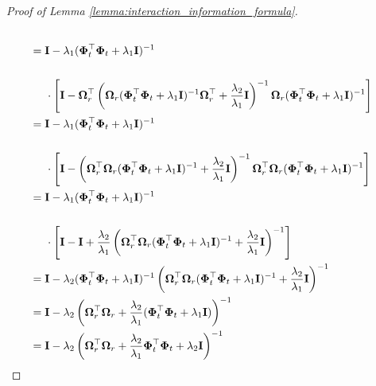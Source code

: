 \begin{proof}[Proof of Lemma \ref{lemma:interaction_information_formula}]
\begin{align}
            \\
            &  = \mathbf{I} -  \lambda_1(\boldsymbol{\Phi}_t^\top\boldsymbol{\Phi}_t+\lambda_1 \mathbf{I})^{-1} \\ \notag
            \\ 
            & \;\;\;\;\;    \cdot \left[\mathbf{I} - \boldsymbol{\Omega}_r^\top \left(\boldsymbol{\Omega}_r(\boldsymbol{\Phi}_t^\top \boldsymbol{\Phi}_t+ \lambda_1\mathbf{I})^{-1}\boldsymbol{\Omega}_r^\top+\frac{\lambda_2} {\lambda_1} \mathbf{I}\right)^{-1} \boldsymbol{\Omega}_r (\boldsymbol{\Phi}_t^\top\boldsymbol{\Phi}_t+\lambda_1 \mathbf{I})^{-1} \right]
            \\
            & = \mathbf{I} -  \lambda_1(\boldsymbol{\Phi}_t^\top\boldsymbol{\Phi}_t+\lambda_1 \mathbf{I})^{-1} \\ \notag 
            \\
            & \;\;\;\;\; \cdot \left[\mathbf{I} -  \left(\boldsymbol{\Omega}_r^\top\boldsymbol{\Omega}_r(\boldsymbol{\Phi}_t^\top \boldsymbol{\Phi}_t+ \lambda_1\mathbf{I})^{-1}+\frac{\lambda_2} {\lambda_1} \mathbf{I}\right)^{-1} \boldsymbol{\Omega}_r^\top\boldsymbol{\Omega}_r (\boldsymbol{\Phi}_t^\top\boldsymbol{\Phi}_t+\lambda_1 \mathbf{I})^{-1}\right] \\ 
            & = \mathbf{I} -  \lambda_1(\boldsymbol{\Phi}_t^\top\boldsymbol{\Phi}_t+\lambda_1 \mathbf{I})^{-1} \\ \notag 
            \\
            & \;\;\;\;\; \cdot \left[\mathbf{I} -  \mathbf{I} + \frac{\lambda_2}{\lambda_1}\left(\boldsymbol{\Omega}_r^\top\boldsymbol{\Omega}_r(\boldsymbol{\Phi}_t^\top \boldsymbol{\Phi}_t+ \lambda_1\mathbf{I})^{-1}+\frac{\lambda_2} {\lambda_1} \mathbf{I}\right)^{-1} \right] \\ 
            & = \mathbf{I} - \lambda_2 (\boldsymbol{\Phi}_t^\top \boldsymbol{\Phi}_t+ \lambda_1\mathbf{I})^{-1}\left(\boldsymbol{\Omega}_r^\top\boldsymbol{\Omega}_r(\boldsymbol{\Phi}_t^\top \boldsymbol{\Phi}_t+ \lambda_1\mathbf{I})^{-1}+\frac{\lambda_2} {\lambda_1} \mathbf{I}\right)^{-1} \\
            & =\mathbf{I} - \lambda_2 \left(\boldsymbol{\Omega}_r^\top\boldsymbol{\Omega}_r+\frac{\lambda_2} {\lambda_1} (\boldsymbol{\Phi}_t^\top \boldsymbol{\Phi}_t+ \lambda_1\mathbf{I})\right)^{-1} \\
            & =\mathbf{I} - \lambda_2 \left(\boldsymbol{\Omega}_r^\top\boldsymbol{\Omega}_r+\frac{\lambda_2} {\lambda_1} \boldsymbol{\Phi}_t^\top \boldsymbol{\Phi}_t+ \lambda_2 \mathbf{I}\right)^{-1}  

\end{align}
\end{proof}

